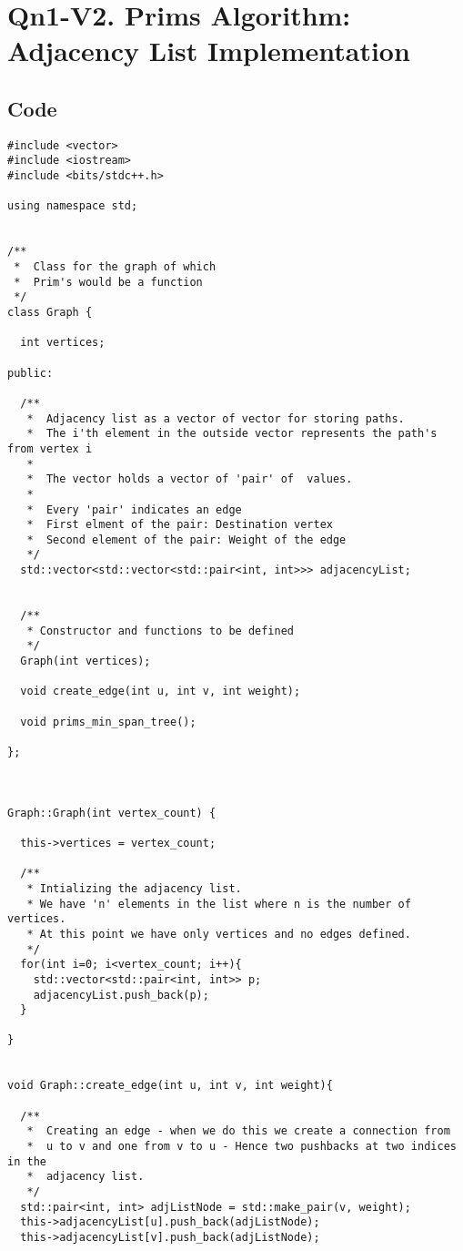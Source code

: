 \documentclass{article}
\begin{document}
\section{Qn1-V2. Prims Algorithm: Adjacency List Implementation}
\subsection{Code}

\begin{verbatim}
#include <vector>
#include <iostream>
#include <bits/stdc++.h>

using namespace std;


/**
 *  Class for the graph of which
 *  Prim's would be a function
 */
class Graph {

  int vertices;

public:

  /**
   *  Adjacency list as a vector of vector for storing paths.
   *  The i'th element in the outside vector represents the path's from vertex i
   *
   *  The vector holds a vector of 'pair' of  values.
   *
   *  Every 'pair' indicates an edge
   *  First elment of the pair: Destination vertex
   *  Second element of the pair: Weight of the edge
   */
  std::vector<std::vector<std::pair<int, int>>> adjacencyList;


  /**
   * Constructor and functions to be defined
   */
  Graph(int vertices);
  
  void create_edge(int u, int v, int weight);
  
  void prims_min_span_tree();

};



Graph::Graph(int vertex_count) {

  this->vertices = vertex_count;

  /**
   * Intializing the adjacency list.
   * We have 'n' elements in the list where n is the number of vertices.
   * At this point we have only vertices and no edges defined.
   */ 
  for(int i=0; i<vertex_count; i++){
    std::vector<std::pair<int, int>> p;
    adjacencyList.push_back(p);
  }

}


void Graph::create_edge(int u, int v, int weight){

  /**
   *  Creating an edge - when we do this we create a connection from
   *  u to v and one from v to u - Hence two pushbacks at two indices in the
   *  adjacency list.
   */
  std::pair<int, int> adjListNode = std::make_pair(v, weight);
  this->adjacencyList[u].push_back(adjListNode);
  this->adjacencyList[v].push_back(adjListNode);


\end{verbatim}
\end{document}
